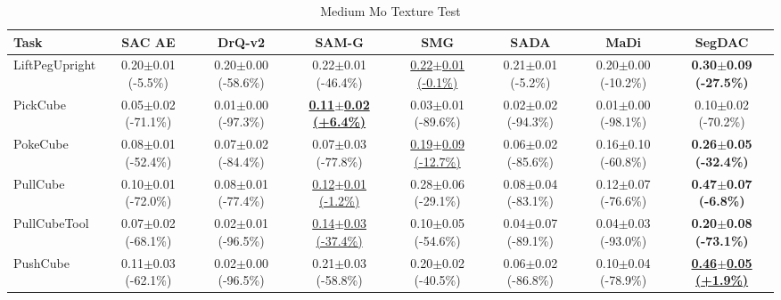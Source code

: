 \begin{table}[htbp]
\centering
\scriptsize
\caption{Medium Mo Texture Test}
\label{tab:appendix_motexturetest_medium}
\begin{adjustbox}{max width=\textwidth}
\begin{tabular}{l*{7}{c}}
\toprule
\textbf{Task} & \textbf{SAC AE} & \textbf{DrQ-v2} & \textbf{SAM-G} & \textbf{SMG} & \textbf{SADA} & \textbf{MaDi} & \textbf{SegDAC} \\
\midrule
LiftPegUpright & 0.20$\pm$0.01 \scriptsize{(-5.5\%)} & 0.20$\pm$0.00 \scriptsize{(-58.6\%)} & 0.22$\pm$0.01 \scriptsize{(-46.4\%)} & \underline{0.22$\pm$0.01 \scriptsize{(-0.1\%)}} & 0.21$\pm$0.01 \scriptsize{(-5.2\%)} & 0.20$\pm$0.00 \scriptsize{(-10.2\%)} & \textbf{0.30$\pm$0.09 \scriptsize{(-27.5\%)}} \\
PickCube & 0.05$\pm$0.02 \scriptsize{(-71.1\%)} & 0.01$\pm$0.00 \scriptsize{(-97.3\%)} & \textbf{\underline{0.11$\pm$0.02 \scriptsize{(+6.4\%)}}} & 0.03$\pm$0.01 \scriptsize{(-89.6\%)} & 0.02$\pm$0.02 \scriptsize{(-94.3\%)} & 0.01$\pm$0.00 \scriptsize{(-98.1\%)} & 0.10$\pm$0.02 \scriptsize{(-70.2\%)} \\
PokeCube & 0.08$\pm$0.01 \scriptsize{(-52.4\%)} & 0.07$\pm$0.02 \scriptsize{(-84.4\%)} & 0.07$\pm$0.03 \scriptsize{(-77.8\%)} & \underline{0.19$\pm$0.09 \scriptsize{(-12.7\%)}} & 0.06$\pm$0.02 \scriptsize{(-85.6\%)} & 0.16$\pm$0.10 \scriptsize{(-60.8\%)} & \textbf{0.26$\pm$0.05 \scriptsize{(-32.4\%)}} \\
PullCube & 0.10$\pm$0.01 \scriptsize{(-72.0\%)} & 0.08$\pm$0.01 \scriptsize{(-77.4\%)} & \underline{0.12$\pm$0.01 \scriptsize{(-1.2\%)}} & 0.28$\pm$0.06 \scriptsize{(-29.1\%)} & 0.08$\pm$0.04 \scriptsize{(-83.1\%)} & 0.12$\pm$0.07 \scriptsize{(-76.6\%)} & \textbf{0.47$\pm$0.07 \scriptsize{(-6.8\%)}} \\
PullCubeTool & 0.07$\pm$0.02 \scriptsize{(-68.1\%)} & 0.02$\pm$0.01 \scriptsize{(-96.5\%)} & \underline{0.14$\pm$0.03 \scriptsize{(-37.4\%)}} & 0.10$\pm$0.05 \scriptsize{(-54.6\%)} & 0.04$\pm$0.07 \scriptsize{(-89.1\%)} & 0.04$\pm$0.03 \scriptsize{(-93.0\%)} & \textbf{0.20$\pm$0.08 \scriptsize{(-73.1\%)}} \\
PushCube & 0.11$\pm$0.03 \scriptsize{(-62.1\%)} & 0.02$\pm$0.00 \scriptsize{(-96.5\%)} & 0.21$\pm$0.03 \scriptsize{(-58.8\%)} & 0.20$\pm$0.02 \scriptsize{(-40.5\%)} & 0.06$\pm$0.02 \scriptsize{(-86.8\%)} & 0.10$\pm$0.04 \scriptsize{(-78.9\%)} & \textbf{\underline{0.46$\pm$0.05 \scriptsize{(+1.9\%)}}} \\

\end{tabular}
\end{adjustbox}
\end{table}
